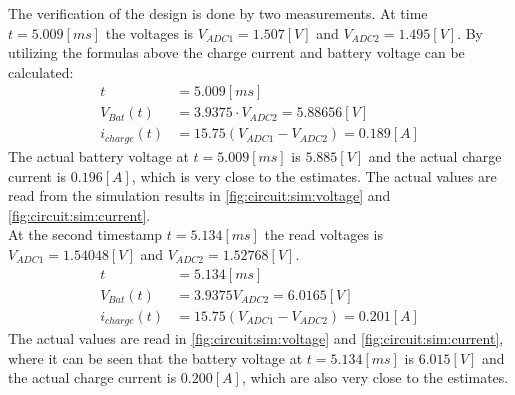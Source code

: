 \documentclass[../report.tex]{subfiles}
\begin{document}
The verification of the design is done by two measurements. At time $t = 5.009 [ms]$ the voltages is $V_{ADC1} = 1.507 [V]$ and $V_{ADC2} = 1.495 [V]$. By utilizing the formulas above the charge current and battery voltage can be calculated:
\begin{align}
    t &= 5.009 [ms]\\
    V_{Bat}(t) &= 3.9375 \cdot V_{ADC2} = 5.88656 [V]\\
    i_{charge}(t) &= 15.75 \left( V_{ADC1} - V_{ADC2} \right) = 0.189 [A]
\end{align}
The actual battery voltage at $t = 5.009 [ms]$ is $5.885 [V]$ and the actual charge current is $0.196 [A]$, which is very close to the estimates. The actual values are read from the simulation results in \autoref{fig:circuit:sim:voltage} and \autoref{fig:circuit:sim:current}.\\
At the second timestamp $t = 5.134 [ms]$ the read voltages is $V_{ADC1} = 1.54048 [V]$ and $V_{ADC2} = 1.52768 [V]$.
\begin{align}
    t &= 5.134 [ms]\\
    V_{Bat}(t) &= 3.9375 V_{ADC2} = 6.0165 [V]\\
    i_{charge}(t) &= 15.75 \left( V_{ADC1} - V_{ADC2} \right) = 0.201 [A]
\end{align}
The actual values are read in  \autoref{fig:circuit:sim:voltage} and \autoref{fig:circuit:sim:current}, where it can be seen that the battery voltage at $t = 5.134 [ms]$ is $6.015 [V]$ and the actual charge current is $0.200 [A]$, which are also very close to the estimates.
\end{document}
